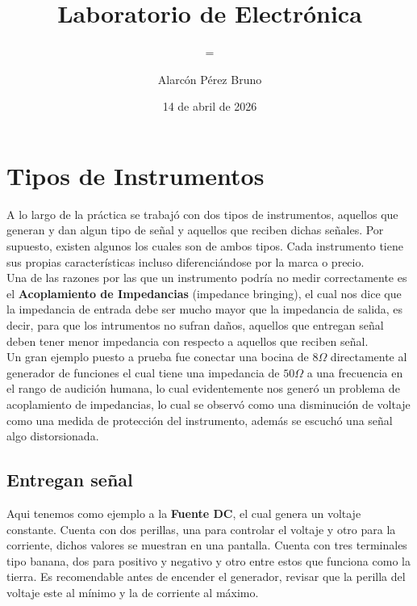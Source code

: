 \documentclass{replab}
\title{Laboratorio de Electrónica}
\author{Alarcón Pérez Bruno}
\date{14 de abril de 2026}
\subtitle={Práctica 2: INSTRUMENTACIÓN Y SEÑALES}
\begin{document}
	
	\pagestyle{fancy}
	\unspacedoperators
	
	\twocolumn[
		\begin{center}
			\maketitle
			
			\smallskip
		\end{center}
	]
	
	
	\section{Tipos de Instrumentos}
	A lo largo de la práctica se trabajó con dos tipos de instrumentos, aquellos que generan y dan algun tipo de señal y aquellos que reciben dichas
	señales. Por supuesto, existen algunos los cuales son de ambos tipos. Cada instrumento tiene sus propias características incluso diferenciándose
	por la marca o precio.\\

	Una de las razones por las que un instrumento podría no medir correctamente es el \textbf{Acoplamiento de Impedancias} (impedance bringing),
	el cual nos dice que la impedancia de entrada debe ser mucho mayor que la impedancia de salida, es decir, para que los intrumentos no sufran daños,
	aquellos que entregan señal deben tener menor impedancia con respecto a aquellos que reciben señal.\\
	Un gran ejemplo puesto a prueba fue conectar una bocina de $8 \Omega$ directamente al generador de funciones el cual tiene una impedancia de
	$50 \Omega$ a una frecuencia en el rango de audición humana, lo cual evidentemente nos generó un problema de acoplamiento de impedancias, lo cual se
	observó como una disminución de voltaje como una medida de protección del instrumento, además se escuchó una señal algo distorsionada.

		\subsection{Entregan señal}
		Aqui tenemos como ejemplo a la \textbf{Fuente DC}, el cual genera un voltaje constante. Cuenta con dos perillas, una para controlar el voltaje
		y otro para la corriente, dichos valores se muestran en una pantalla. Cuenta con tres terminales tipo banana, dos para positivo y negativo y otro
		entre estos que funciona como la tierra. Es recomendable antes de encender el generador, revisar que la perilla del voltaje este al mínimo y la
		de corriente al máximo.
\end{document}
